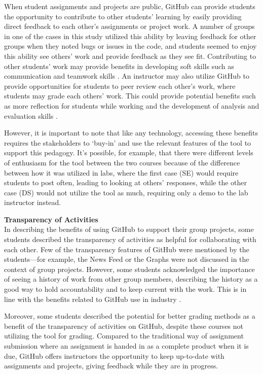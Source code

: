 When student assignments and projects are public, GitHub can provide students the opportunity to contribute to other students' learning by easily providing direct feedback to each other's assignments or project work. A number of groups in one of the cases in this study utilized this ability by leaving feedback for other groups when they noted bugs or issues in the code, and students seemed to enjoy this ability see others' work and provide feedback as they see fit. Contributing to other students' work may provide benefits in developing soft skills such as communication and teamwork skills \cite{hamer2006some}. An instructor may also utilize GitHub to provide opportunities for students to peer review each other's work, where students may grade each others' work. This could provide potential benefits such as more reflection for students while working and the development of analysis and evaluation skills \cite{sondergaard2012collaborative}.

However, it is important to note that like any technology, accessing these benefits requires the stakeholders to `buy-in' and use the relevant features of the tool to support this pedagogy. It's possible, for example, that there were different levels of enthusiasm for the tool between the two courses because of the difference between how it was utilized in labs, where the first case (SE) would require students to post often, leading to looking at others' responses, while the other case (DS) would not utilize the tool as much, requiring only a demo to the lab instructor instead.

\textbf{Transparency of Activities} \\
In describing the benefits of using GitHub to support their group projects, some students described the transparency of activities as helpful for collaborating with each other. Few of the transparency features of GitHub were mentioned by the students---for example, the News Feed or the Graphs were not discussed in the context of group projects. However, some students acknowledged the importance of seeing a history of work from other group members, describing the history as a good way to hold accountability and to keep current with the work. This is in line with the benefits related to GitHub use in industry \cite{dabbish2012social}.

Moreover, some students described the potential for better grading methods as a benefit of the transparency of activities on GitHub, despite these courses not utilizing the tool for grading. Compared to the traditional way of assignment submission where an assignment is handed in as a complete product when it is due, GitHub offers instructors the opportunity to keep up-to-date with assignments and projects, giving feedback while they are in progress.

